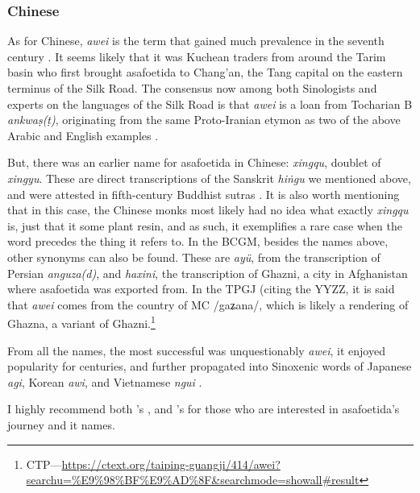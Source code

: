 \subsubsection{Chinese}



As for Chinese,  \textit{awei} is the term that gained much prevalence in the seventh century \autocite{leung_itinerary_2019}. It seems likely that it was Kuchean traders from around the Tarim basin who first brought asafoetida to Chang'an, the Tang capital on the eastern terminus of the Silk Road. The consensus now among both Sinologists and experts on the languages of the Silk Road is that \textit{awei} is a loan from Tocharian B \textit{ankwaṣ(ṭ)}, originating from the same Proto-Iranian etymon as two of the above Arabic and English examples \autocites[353]{laufer_sino-iranica_1919}[121]{baxter_old_2014}.



But, there was an earlier name for asafoetida in Chinese:  \textit{xingqu}, doublet of  \textit{xingyu}. These are direct transcriptions of the Sanskrit \textit{hiṅgu} we mentioned above, and were attested in fifth-century Buddhist sutras \autocite{leung_itinerary_2019}. It is also worth mentioning that in this case, the Chinese monks most likely had no idea what exactly \textit{xingqu} is, just that it some plant resin, and as such, it exemplifies a rare case when the word precedes the thing it refers to. In the \gls{BCGM}, besides the names above, other synonyms can also be found. These are  \textit{ayü}, from the transcription of Persian \textit{anguza(d)}, and  \textit{haxini}, the transcription of Ghazni, a city in Afghanistan where asafoetida was exported from. In the \gls{TPGJ} (citing the \gls{YYZZ}, it is said that \textit{awei} comes from the country of  \gls{MC} /gaʑana/, which is likely a rendering of Ghazna, a variant of Ghazni.\footnote{\gls{CTP}---\url{https://ctext.org/taiping-guangji/414/awei?searchu=\%E9\%98\%BF\%E9\%AD\%8F&searchmode=showall\#result}}

From all the names, the most successful was unquestionably \textit{awei}, it enjoyed popularity for centuries, and further propagated into Sinoxenic words of Japanese  \textit{agi}, Korean  \textit{awi}, and Vietnamese \textit{ngui} \autocites{leung_itinerary_2019}.

I highly recommend both \textcite[]{laufer_sino-iranica_1919}'s , and \textcite{leung_itinerary_2019}'s  for those who are interested in asafoetida's journey and it names.  

